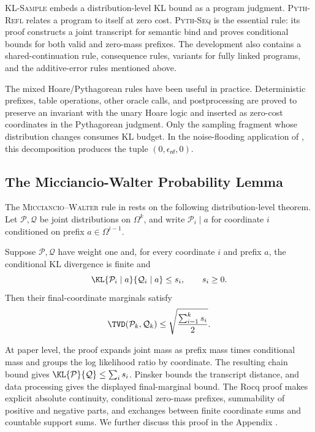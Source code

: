 \textsc{KL-Sample} embeds a distribution-level KL bound as a program judgment.
\textsc{Pyth-Refl} relates a program to itself at zero cost.
\textsc{Pyth-Seq} is the essential rule: its proof constructs a joint transcript for semantic bind and proves conditional bounds for both valid and zero-mass prefixes.
The development also contains a shared-continuation rule, consequence rules,
variants for fully linked programs, and the additive-error rules mentioned
above.

The mixed Hoare/Pythagorean rules have been useful in practice.
Deterministic prefixes, table operations, other oracle calls, and postprocessing are proved to preserve an invariant with the unary Hoare logic and inserted as zero-cost coordinates in the Pythagorean judgment.
Only the sampling fragment whose distribution changes consumes KL budget.
In the noise-flooding application of , this decomposition
produces the tuple \((0,\epsilon_{\mathsf{nf}},0)\).

\subsection{The Micciancio-Walter Probability Lemma}

The \textsc{Micciancio--Walter} rule in  rests on the
following distribution-level theorem.
Let \(\mathcal P,\mathcal Q\) be joint distributions on \(\Omega^k\), and write \(\mathcal P_i\mid a\) for coordinate \(i\) conditioned on prefix \(a\in\Omega^{i-1}\).

\begin{theorem}
\label{thm:pyth-probability}
Suppose \(\mathcal P,\mathcal Q\) have weight one and, for every coordinate
\(i\) and prefix \(a\), the conditional KL divergence is finite and
\[
 \KL{\mathcal P_i\mid a}{\mathcal Q_i\mid a}\leq s_i,
 \qquad s_i\geq0.
\]
Then their final-coordinate marginals satisfy
\[
 \TVD(\mathcal{P}_k,
      \mathcal{Q}_k)
 \leq \sqrt{\frac{\sum_{i=1}^{k}s_i}{2}}.
\]
\end{theorem}

At paper level, the proof expands joint mass as prefix mass times conditional mass and groups the log likelihood ratio by coordinate.
The resulting chain bound gives \(\KL{\mathcal P}{\mathcal Q}\leq\sum_i s_i\).
Pinsker bounds the transcript distance, and data processing gives the displayed final-marginal bound.
The Rocq proof makes explicit absolute continuity, conditional zero-mass prefixes, summability of positive and negative parts, and exchanges between finite coordinate sums and countable support sums.
We further discuss this proof in the Appendix .

